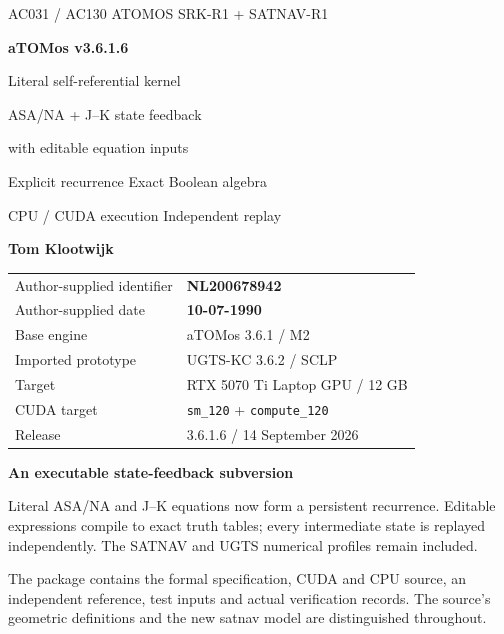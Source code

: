 \documentclass[11pt,a4paper]{article}
\newcommand{\code}[1]{\texttt{#1}}
\begin{document}
\begin{titlepage}
\thispagestyle{empty}
{\sffamily\color{accent}\large AC031 / AC130 ATOMOS \hfill SRK-R1 + SATNAV-R1}\par
\vspace{20mm}
{\sffamily\bfseries\fontsize{54}{60}\selectfont\color{ink}aTOMos v3.6.1.6}\par
\vspace{9mm}
{\sffamily\fontsize{28}{34}\selectfont Literal self-referential kernel}\par
\vspace{5mm}
{\sffamily\fontsize{21}{28}\selectfont\color{gold}ASA/NA + J--K state feedback\par
with editable equation inputs}\par
\vspace{12mm}
{\large Explicit recurrence \;\textperiodcentered\; Exact Boolean algebra\par
CPU / CUDA execution \;\textperiodcentered\; Independent replay}\par
\vspace{18mm}
{\sffamily\bfseries\Large Tom Klootwijk}\par
\begin{tabular}{@{}ll@{}}
Author-supplied identifier & \textbf{NL200678942}\\
Author-supplied date & \textbf{10-07-1990}\\
Base engine & aTOMos 3.6.1 / M2\\
Imported prototype & UGTS-KC 3.6.2 / SCLP\\
Target & RTX 5070 Ti Laptop GPU / 12 GB\\
CUDA target & \code{sm\_120} + \code{compute\_120}\\
Release & 3.6.1.6 / 14 September 2026\\
\end{tabular}
\vfill
\begin{panel}
\textbf{An executable state-feedback subversion}\par
Literal ASA/NA and J--K equations now form a persistent recurrence. Editable
expressions compile to exact truth tables; every intermediate state is replayed
independently. The SATNAV and UGTS numerical profiles remain included.
\end{panel}
{\small\color{muted}The package contains the formal specification, CUDA and CPU source, an independent
reference, test inputs and actual verification records. The source's geometric definitions and the new
satnav model are distinguished throughout.}
\end{titlepage}
\setcounter{page}{2}
\end{document}
